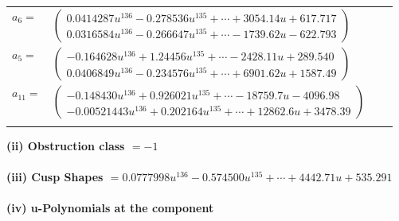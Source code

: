 \documentclass[1p]{elsarticle_modified}
\theoremstyle{definition}
\begin{document}
\begin{tabular}{m{7pt} m{180pt} m{7pt} m{180pt} }
\flushright $a_{6}=$&$\begin{pmatrix}0.0414287 u^{136}-0.278536 u^{135}+\cdots+3054.14 u+617.717\\0.0316584 u^{136}-0.266647 u^{135}+\cdots-1739.62 u-622.793\end{pmatrix}$ \\
\flushright $a_{5}=$&$\begin{pmatrix}-0.164628 u^{136}+1.24456 u^{135}+\cdots-2428.11 u+289.540\\0.0406849 u^{136}-0.234576 u^{135}+\cdots+6901.62 u+1587.49\end{pmatrix}$ \\
\flushright $a_{11}=$&$\begin{pmatrix}-0.148430 u^{136}+0.926021 u^{135}+\cdots-18759.7 u-4096.98\\-0.00521443 u^{136}+0.202164 u^{135}+\cdots+12862.6 u+3478.39\end{pmatrix}$\\&\end{tabular}
\flushleft \textbf{(ii) Obstruction class $= -1$}\\~\\
\flushleft \textbf{(iii) Cusp Shapes $= 0.0777998 u^{136}-0.574500 u^{135}+\cdots+4442.71 u+535.291$}\\~\\
\newpage\renewcommand{\arraystretch}{1}
\flushleft \textbf{(iv) u-Polynomials at the component}\newline \\
\end{document}
